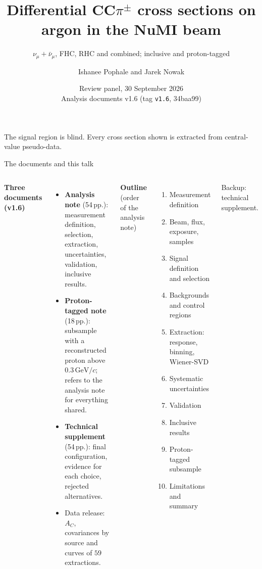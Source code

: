 \documentclass[aspectratio=169,10pt]{beamer}
\title[Review panel]{Differential CC$\pi^{\pm}$ cross sections on argon in the NuMI beam}
\subtitle{$\nu_\mu+\bar\nu_\mu$, FHC, RHC and combined; inclusive and proton-tagged}
\author[Pophale, Nowak]{Ishanee Pophale and Jarek Nowak}
\institute{Lancaster University}
\date{Review panel, 30 September 2026\\[1mm]\footnotesize Analysis documents v1.6 (tag \texttt{v1.6}, 34baa99)}
\newcommand{\GeVc}{\,\text{GeV}/c}
\begin{document}
{
\begin{frame}[plain]
  \titlepage
  \begin{center}\footnotesize\color{ubdark}
  The signal region is blind. Every cross section shown is extracted from central-value pseudo-data.
  \end{center}
\end{frame}}

\begin{frame}{The documents and this talk}
  \begin{columns}[T]
  \textbf{Three documents (v1.6)}
  \begin{itemize}\small
    \item \textbf{Analysis note} (54\,pp.): measurement definition, selection, extraction, uncertainties,
      validation, inclusive results.
    \item \textbf{Proton-tagged note} (18\,pp.): subsample with a reconstructed proton above
      $0.3\GeVc$; refers to the analysis note for everything shared.
    \item \textbf{Technical supplement} (54\,pp.): final configuration, evidence for each choice,
      rejected alternatives.
    \item Data release: $A_C$, covariances by source and curves of $59$ extractions.
  \end{itemize}
  \textbf{Outline} (order of the analysis note)
  \begin{enumerate}\small\setlength\itemsep{0pt}
    \item Measurement definition
    \item Beam, flux, exposure, samples
    \item Signal definition and selection
    \item Backgrounds and control regions
    \item Extraction: response, binning, Wiener-SVD
    \item Systematic uncertainties
    \item Validation
    \item Inclusive results
    \item Proton-tagged subsample
    \item Limitations and summary
  \end{enumerate}
  Backup: technical supplement.
  \end{columns}
\end{frame}
\end{document}
